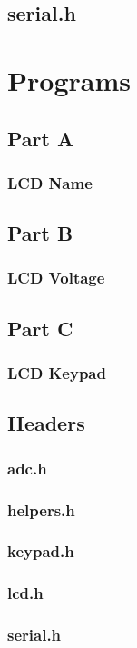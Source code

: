 \documentclass[letterpaper, 12pt]{article}
\begin{document}
\subsection*{serial.h}

\section*{Programs}
\subsection*{Part A}
\subsubsection*{LCD Name}

\subsection*{Part B}
\subsubsection*{LCD Voltage}

\subsection*{Part C}
\subsubsection*{LCD Keypad}

\subsection*{Headers}
\subsubsection*{adc.h}

\subsubsection*{helpers.h}

\subsubsection*{keypad.h}

\subsubsection*{lcd.h}

\subsubsection*{serial.h}

\end{document}
